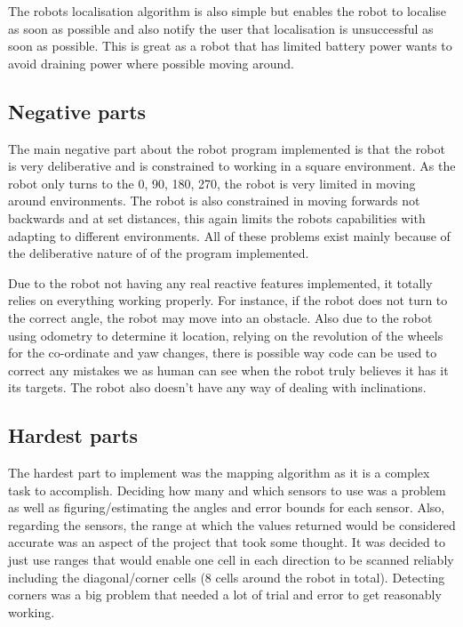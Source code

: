 \documentclass[a4paper,12pt]{article}
\begin{document}
\vspace{5mm}
\noindent The robots localisation algorithm is also simple but enables the robot to localise as soon as possible and also notify the user that localisation is unsuccessful as soon as possible. This is great as a robot that has limited battery power wants to avoid draining power where possible moving around.

\subsection{Negative parts}
\noindent The main negative part about the robot program implemented is that the robot is very deliberative and is constrained to working in a square environment. As the robot only turns to the 0, 90, 180, 270, the robot is very limited in moving around environments. The robot is also constrained in moving forwards not backwards and at set distances, this again limits the robots capabilities with adapting to different environments. All of these problems exist mainly because of the deliberative nature of of the program implemented.

\vspace{5mm}
\noindent Due to the robot not having any real reactive features implemented, it totally relies on everything working properly. For instance, if the robot does not turn to the correct angle, the robot may move into an obstacle. Also due to the robot using odometry to determine it location, relying on the revolution of the wheels for the co-ordinate and yaw changes, there is possible way code can be used to correct any mistakes we as human can see when the robot truly believes it has it its targets. The robot also doesn't have any way of dealing with inclinations.

\subsection{Hardest parts}
\noindent The hardest part to implement was the mapping algorithm as it is a complex task to accomplish. Deciding how many and which sensors to use was a problem as well as figuring/estimating the angles and error bounds for each sensor. Also, regarding the sensors, the range at which the values returned would be considered accurate was an aspect of the project that took some thought. It was decided to just use ranges that would enable one cell in each direction to be scanned reliably including the diagonal/corner cells (8 cells around the robot in total). Detecting corners was a big problem that needed a lot of trial and error to get reasonably working.
\end{document}
